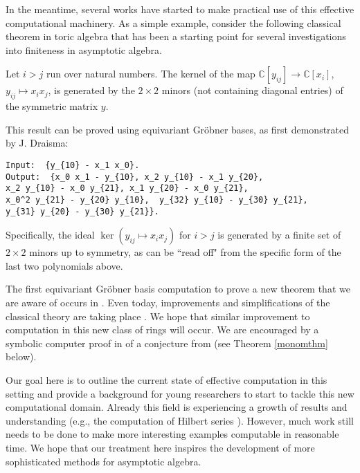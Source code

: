In the meantime, several works have started to make practical use of this effective computational machinery.  As a simple example, consider 
the following classical theorem in toric algebra that has been a starting point for several investigations into finiteness in asymptotic algebra.

\begin{theorem}\label{toric2x2}
Let $i > j$ run over natural numbers.  The kernel of the map $\mathbb C[y_{ij}] \to \mathbb C[x_i]$, $y_{ij} \mapsto x_i x_j$, is generated by the $2 \times 2$ minors (not containing diagonal entries) of the symmetric matrix $y$.
\end{theorem}

This result can be proved using equivariant Gr\"obner bases, as first demonstrated by J. Draisma:
\begin{M2}
\begin{verbatim}
Input:  {y_{10} - x_1 x_0}.
Output:  {x_0 x_1 - y_{10}, x_2 y_{10} - x_1 y_{20}, 
x_2 y_{10} - x_0 y_{21}, x_1 y_{20} - x_0 y_{21}, 
x_0^2 y_{21} - y_{20} y_{10},  y_{32} y_{10} - y_{30} y_{21}, 
y_{31} y_{20} - y_{30} y_{21}}.
\end{verbatim}
\end{M2}  
\medskip
Specifically, the ideal $\ker{(y_{ij} \mapsto x_i x_j)}$ for $i > j$ is generated by a finite set of $2 \times 2$ minors up to symmetry, 
as can be ``read off" from the specific form of the last two polynomials above.

The first equivariant Gr\"obner basis computation to prove a new theorem that we are aware of occurs in \cite{Brouwer09e}. Even today, improvements and simplifications of the classical theory are taking place \cite{schauenburg2007grobner}.  We hope that similar improvement to computation in this new class of rings will occur.  We are encouraged by a symbolic computer proof in \cite{draisma2013noetherianity} of a conjecture from \cite{aschenbrenner2007finite} (see Theorem \ref{monomthm} below).

Our goal here is to outline the current state of effective computation in this setting and provide a background for young researchers to start to tackle this new computational domain.  Already this field is experiencing a growth of results and understanding (e.g., the computation of Hilbert series \cite{Nagel, krone2016hilbert}).  However, much work still needs to be done to make more interesting examples computable in reasonable time.  We hope that our treatment here inspires the development of more sophisticated methods for asymptotic algebra.
